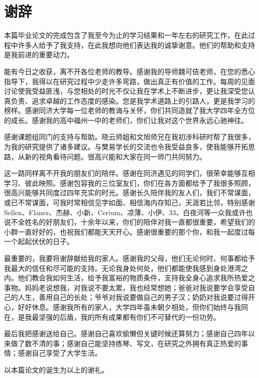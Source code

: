 \chapter*{谢辞}

本篇毕业论文的完成包含了我至今为止的学习结果和一年左右的研究工作，在此过程中许多人给予了我支持，在此我想向他们表达我的诚挚谢意。他们的帮助和支持是我前进的重要动力。

能有今日之收获，离不开各位老师的教导。感谢我的导师魏可佶老师，在您的悉心指导下，我得以在研究过程中少走许多弯路，做出真正有价值的工作。每周的见面讨论使我受益匪浅，与您相处的时光不仅让我在学术上不断进步，更让我深受您认真负责、追求卓越的工作态度的感染。您是我学术道路上的引路人，更是我学习的榜样。感谢同济大学每一位老师的教诲与关怀，你们共同造就了我大学四年全方位的成长。感谢我的高中福州一中的老师们，你们让我对这个世界永远心驰神往。

感谢课题组同门的支持与帮助。晓云师姐和文旭师兄在我初涉科研时帮了我很多，为我的研究提供了诸多建议。与樊易学长的交流也令我受益良多，使我能够开拓思路，从新的视角看待问题。很高兴能和大家在同一师门共同努力。

这一路同样离不开我的朋友们的陪伴。感谢在同济遇见的同学们，很荣幸能够互相学习、彼此映照。感谢包容我的三位室友们，你们在各方面都给予了我很多照顾，很高兴能够共同度过四年充实的时光。感谢长久陪伴我的友人们，我们不常谋面，或已不常谋面，可我时常相信见字如面、相信海内存知己，天涯若比邻，特别感谢Sellen、Flanez、杰赫、小新、Cerium、凉薄、小伊、33、白夜河等一众我或许也说不全姓名的好朋友们，十余年以来，你们的陪伴对我一直都很重要，希望我们的小群一直好好的，也祝我们都能天天开心。感谢很重要的那个你，和我一起度过每一个起起伏伏的日子。

最重要的，我要将谢辞献给我的家人。感谢我的父母，他们无论何时、何事都给予我最大的信任和尽可能的支持。无论我身处何处，他们都能使我感到身处港湾之内。他们教会我如何生活，给予我富裕的物质条件，支持我全身心追求我所热爱之事物。妈妈老说想我，对我说不要太累，我也经常想她；爸爸对我说要学会享受自己的人生，善用自己的长处；爷爷对我说要做自己的男子汉；奶奶对我说要过得开心，好好休息。感谢我所有的家人，大学四年虽未朝夕相处，但你们始终与我同在，是我最坚强的后盾，我的所有成果都有你们不可替代的一份功劳。

最后我把感谢送给自己。感谢自己喜欢偷懒但关键时候还算努力；感谢自己四年以来做了数不清的事；感谢自己能坚持练琴、写文，在研究之外拥有真正热爱的事情；感谢自己享受了大学生活。

以本篇论文的诞生为以上的谢礼。